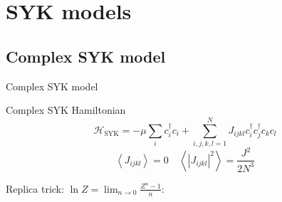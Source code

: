 \section{SYK models}
\subsection{Complex SYK model}
\begin{frame}{Complex SYK model}
\begin{block}{Complex SYK Hamiltonian}
\begin{equation*}
\mathcal{H}_{\mathrm{SYK}} = -\mu\sum_{i} c_{i}^{\dagger} c_{i} + \sum_{i,j,k,l=1}^{N}J_{ijkl} c_{i}^{\dagger} c_{j}^{\dagger} c_{k} c_{l}
\end{equation*}
\vspace{-3mm}
\begin{equation*}
\left\langle J_{ijkl} \right\rangle = 0 \quad \left\langle |J_{ijkl}|^2 \right\rangle = \frac{J^2}{2N^3}
\end{equation*}
\end{block}


\qquad Replica trick: $\ln Z = \lim_{n \to 0} \frac{Z^n - 1}{n}$:


\end{frame}
